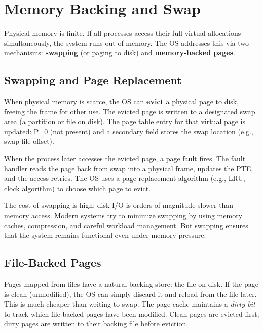 \documentclass[11pt]{article}
\begin{document}
\section{Memory Backing and Swap}

Physical memory is finite. If all processes access their full virtual allocations simultaneously, the system runs out of memory. The OS addresses this via two mechanisms: \textbf{swapping} (or paging to disk) and \textbf{memory-backed pages}.

\subsection{Swapping and Page Replacement}

When physical memory is scarce, the OS can \textbf{evict} a physical page to disk, freeing the frame for other use. The evicted page is written to a designated swap area (a partition or file on disk). The page table entry for that virtual page is updated: P=0 (not present) and a secondary field stores the swap location (e.g., swap file offset).

When the process later accesses the evicted page, a page fault fires. The fault handler reads the page back from swap into a physical frame, updates the PTE, and the access retries. The OS uses a page replacement algorithm (e.g., LRU, clock algorithm) to choose which page to evict.

The cost of swapping is high: disk I/O is orders of magnitude slower than memory access. Modern systems try to minimize swapping by using memory caches, compression, and careful workload management. But swapping ensures that the system remains functional even under memory pressure.

\subsection{File-Backed Pages}

Pages mapped from files have a natural backing store: the file on disk. If the page is clean (unmodified), the OS can simply discard it and reload from the file later. This is much cheaper than writing to swap. The page cache maintains a \emph{dirty bit} to track which file-backed pages have been modified. Clean pages are evicted first; dirty pages are written to their backing file before eviction.
\end{document}
